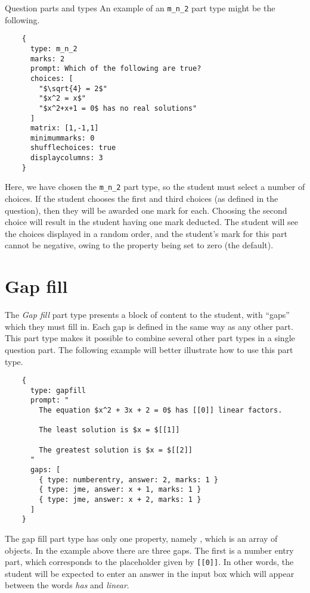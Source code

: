 \begin{chapter}{\label{cha:question_parts}Question parts and types}
  An example of an \verb"m_n_2" part type might be the following.
  \begin{Verbatim}
    {
      type: m_n_2
      marks: 2
      prompt: Which of the following are true?
      choices: [
        "$\sqrt{4} = 2$"
        "$x^2 = x$"
        "$x^2+x+1 = 0$ has no real solutions"
      ]
      matrix: [1,-1,1]
      minimummarks: 0
      shufflechoices: true
      displaycolumns: 3
    }
  \end{Verbatim}
  Here, we have chosen the \verb"m_n_2" part type, so the student must select a
  number of choices.  If the student chooses the first and third choices (as
  defined in the question), then they will be awarded one mark for each.
  Choosing the second choice will result in the student having one mark
  deducted.  The student will see the choices displayed in a random order, and
  the student's mark for this part cannot be negative, owing to the
   property being set to zero (the default).

  \section{\label{sec:gapfill_part}Gap fill}
  The \emph{Gap fill} part type presents a block of content to the student,
  with ``gaps'' which they must fill in.  Each gap is defined in the same way
  as any other part.  This part type makes it possible to combine several other
  part types in a single question part.  The following example will better
  illustrate how to use this part type.
  \begin{Verbatim}
    {
      type: gapfill
      prompt: "
        The equation $x^2 + 3x + 2 = 0$ has [[0]] linear factors.

        The least solution is $x = $[[1]]

        The greatest solution is $x = $[[2]]
      "
      gaps: [
        { type: numberentry, answer: 2, marks: 1 }
        { type: jme, answer: x + 1, marks: 1 }
        { type: jme, answer: x + 2, marks: 1 }
      ]
    }
  \end{Verbatim}
  The gap fill part type has only one property, namely , which
  is an array of  objects.  In the example above there are
  three gaps.  The first is a number entry part, which corresponds to the
  placeholder given by \verb"[[0]]".  In other words, the student will be
  expected to enter an answer in the input box which will appear between the
  words \emph{has} and \emph{linear}.


\end{chapter}
